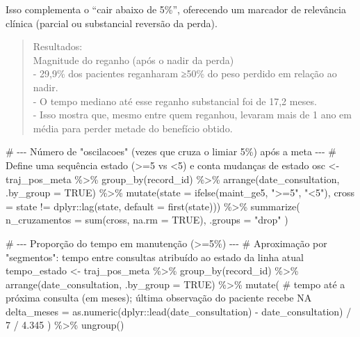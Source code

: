 \documentclass[
]{article}
\newenvironment{Shaded}{\begin{snugshade}}{\end{snugshade}}
\newcommand{\AttributeTok}[1]{\textcolor[rgb]{0.40,0.45,0.13}{#1}}
\newcommand{\CommentTok}[1]{\textcolor[rgb]{0.37,0.37,0.37}{#1}}
\newcommand{\ConstantTok}[1]{\textcolor[rgb]{0.56,0.35,0.01}{#1}}
\newcommand{\DecValTok}[1]{\textcolor[rgb]{0.68,0.00,0.00}{#1}}
\newcommand{\FloatTok}[1]{\textcolor[rgb]{0.68,0.00,0.00}{#1}}
\newcommand{\FunctionTok}[1]{\textcolor[rgb]{0.28,0.35,0.67}{#1}}
\newcommand{\NormalTok}[1]{\textcolor[rgb]{0.00,0.23,0.31}{#1}}
\newcommand{\OtherTok}[1]{\textcolor[rgb]{0.00,0.23,0.31}{#1}}
\newcommand{\SpecialCharTok}[1]{\textcolor[rgb]{0.37,0.37,0.37}{#1}}
\newcommand{\StringTok}[1]{\textcolor[rgb]{0.13,0.47,0.30}{#1}}
\begin{document}
Isso complementa o ``cair abaixo de 5\%'', oferecendo um marcador de
relevância clínica (parcial ou substancial reversão da perda).

\begin{quote}
Resultados:\\
Magnitude do reganho (após o nadir da perda)\\
- 29,9\% dos pacientes reganharam ≥50\% do peso perdido em relação ao
nadir.\\
- O tempo mediano até esse reganho substancial foi de 17,2 meses.\\
- Isso mostra que, mesmo entre quem reganhou, levaram mais de 1 ano em
média para perder metade do benefício obtido.\\
\end{quote}

\begin{Shaded}
\begin{Highlighting}[]
\CommentTok{\# {-}{-}{-} Número de "oscilacoes" (vezes que cruza o limiar 5\%) após a meta {-}{-}{-}}
\CommentTok{\# Define uma sequência estado (\textgreater{}=5 vs \textless{}5) e conta mudanças de estado}
\NormalTok{osc }\OtherTok{\textless{}{-}}\NormalTok{ traj\_pos\_meta }\SpecialCharTok{\%\textgreater{}\%}
  \FunctionTok{group\_by}\NormalTok{(record\_id) }\SpecialCharTok{\%\textgreater{}\%}
  \FunctionTok{arrange}\NormalTok{(date\_consultation, }\AttributeTok{.by\_group =} \ConstantTok{TRUE}\NormalTok{) }\SpecialCharTok{\%\textgreater{}\%}
  \FunctionTok{mutate}\NormalTok{(}\AttributeTok{state =} \FunctionTok{ifelse}\NormalTok{(maint\_ge5, }\StringTok{"\textgreater{}=5"}\NormalTok{, }\StringTok{"\textless{}5"}\NormalTok{),}
         \AttributeTok{cross =}\NormalTok{ state }\SpecialCharTok{!=}\NormalTok{ dplyr}\SpecialCharTok{::}\FunctionTok{lag}\NormalTok{(state, }\AttributeTok{default =} \FunctionTok{first}\NormalTok{(state))) }\SpecialCharTok{\%\textgreater{}\%}
  \FunctionTok{summarize}\NormalTok{(}
    \AttributeTok{n\_cruzamentos =} \FunctionTok{sum}\NormalTok{(cross, }\AttributeTok{na.rm =} \ConstantTok{TRUE}\NormalTok{), }\AttributeTok{.groups =} \StringTok{"drop"}
\NormalTok{  )}

\CommentTok{\# {-}{-}{-} Proporção do tempo em manutenção (\textgreater{}=5\%) {-}{-}{-}}
\CommentTok{\# Aproximação por "segmentos": tempo entre consultas atribuído ao estado da linha atual}
\NormalTok{tempo\_estado }\OtherTok{\textless{}{-}}\NormalTok{ traj\_pos\_meta }\SpecialCharTok{\%\textgreater{}\%}
  \FunctionTok{group\_by}\NormalTok{(record\_id) }\SpecialCharTok{\%\textgreater{}\%}
  \FunctionTok{arrange}\NormalTok{(date\_consultation, }\AttributeTok{.by\_group =} \ConstantTok{TRUE}\NormalTok{) }\SpecialCharTok{\%\textgreater{}\%}
  \FunctionTok{mutate}\NormalTok{(}
    \CommentTok{\# tempo até a próxima consulta (em meses); última observação do paciente recebe NA}
    \AttributeTok{delta\_meses =} \FunctionTok{as.numeric}\NormalTok{(dplyr}\SpecialCharTok{::}\FunctionTok{lead}\NormalTok{(date\_consultation) }\SpecialCharTok{{-}}\NormalTok{ date\_consultation) }\SpecialCharTok{/} \DecValTok{7} \SpecialCharTok{/} \FloatTok{4.345}
\NormalTok{  ) }\SpecialCharTok{\%\textgreater{}\%}
  \FunctionTok{ungroup}\NormalTok{()}


\end{Highlighting}
\end{Shaded}
\end{document}
